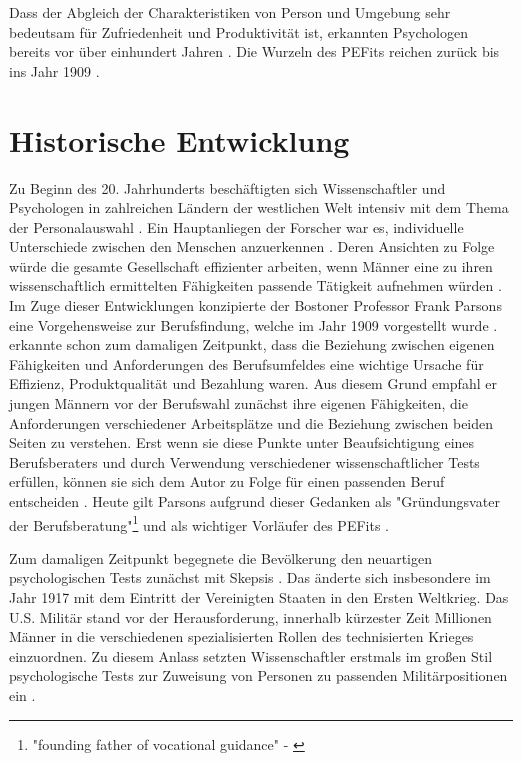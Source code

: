 Dass der Abgleich der Charakteristiken von Person und Umgebung sehr bedeutsam für Zufriedenheit und Produktivität ist, erkannten Psychologen bereits vor über einhundert Jahren \cite[S. 3ff.]{parsons:1909}. Die Wurzeln des \acp{PEFit} reichen zurück bis ins Jahr 1909 \cite[S. 1]{su:2015}.

\section{Historische Entwicklung}
\label{ch:personEnvironmentFit:historisches}
Zu Beginn des 20. Jahrhunderts beschäftigten sich Wissenschaftler und Psychologen in zahlreichen Ländern der westlichen Welt intensiv mit dem Thema der Personalauswahl \cite[S. 1f.]{salgado:2001}. Ein Hauptanliegen der Forscher war es, individuelle Unterschiede zwischen den Menschen anzuerkennen \cite[S. 1ff.]{stern:1900}. Deren Ansichten zu Folge würde die gesamte Gesellschaft effizienter arbeiten, wenn Männer eine zu ihren wissenschaftlich ermittelten Fähigkeiten passende Tätigkeit aufnehmen würden \cite[S. 1f.]{kevles:1968}. Im Zuge dieser Entwicklungen konzipierte der Bostoner Professor Frank Parsons eine Vorgehensweise zur Berufsfindung, welche im Jahr 1909 vorgestellt wurde \cite[S. 3]{porfeli:2009}\cite[S. 1]{su:2015}. \textcite[S. 5ff.]{parsons:1909} erkannte schon zum damaligen Zeitpunkt, dass die Beziehung zwischen eigenen Fähigkeiten und Anforderungen des Berufsumfeldes eine wichtige Ursache für Effizienz, Produktqualität und Bezahlung waren. Aus diesem Grund empfahl er jungen Männern vor der Berufswahl zunächst ihre eigenen Fähigkeiten, die Anforderungen verschiedener Arbeitsplätze und die Beziehung zwischen beiden Seiten zu verstehen. Erst wenn sie diese Punkte unter Beaufsichtigung eines Berufsberaters und durch Verwendung verschiedener wissenschaftlicher Tests erfüllen, können sie sich dem Autor zu Folge für einen passenden Beruf entscheiden \cite[S. 5ff.]{parsons:1909}. Heute gilt Parsons aufgrund dieser Gedanken als "Gründungsvater der Berufsberatung"\footnote{"founding father of vocational guidance" - \textcite[S. 3, Z. 29]{porfeli:2009}} \cite[S. 3, Z. 29]{porfeli:2009} und als wichtiger Vorläufer des \acp{PEFit} \cite[S. 2]{edwards:2008}\cite[S. 1]{su:2015}.

Zum damaligen Zeitpunkt begegnete die Bevölkerung den neuartigen psychologischen Tests zunächst mit Skepsis \cite[S. 2]{kevles:1968}. Das änderte sich insbesondere im Jahr 1917 mit dem Eintritt der Vereinigten Staaten in den Ersten Weltkrieg. Das U.S. Militär stand vor der Herausforderung, innerhalb kürzester Zeit Millionen Männer in die verschiedenen spezialisierten Rollen des technisierten Krieges einzuordnen. Zu diesem Anlass setzten Wissenschaftler erstmals im großen Stil psychologische Tests zur Zuweisung von Personen zu passenden Militärpositionen ein \cite[S. 2ff.]{kevles:1968}. 


